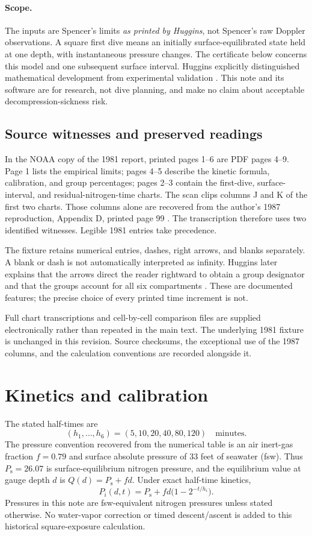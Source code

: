 \documentclass[11pt,letterpaper]{article}
\newcommand{\Ps}{P_{\mathrm{s}}}
\begin{document}
\paragraph{Scope.}
The inputs are Spencer's limits \emph{as printed by Huggins}, not Spencer's raw Doppler observations. A square first dive means an initially surface-equilibrated state held at one depth, with instantaneous pressure changes. The certificate below concerns this model and one subsequent surface interval. Huggins explicitly distinguished mathematical development from experimental validation \cite[disclaimer and p.~6]{Huggins1981}. This note and its software are for research, not dive planning, and make no claim about acceptable decompression-sickness risk.

\subsection{Source witnesses and preserved readings}
In the NOAA copy of the 1981 report, printed pages 1--6 are PDF pages 4--9. Page 1 lists the empirical limits; pages 4--5 describe the kinetic formula, calibration, and group percentages; pages 2--3 contain the first-dive, surface-interval, and residual-nitrogen-time charts. The scan clips columns J and K of the first two charts. Those columns alone are recovered from the author's 1987 reproduction, Appendix D, printed page 99 \cite{Huggins1987}. The transcription therefore uses two identified witnesses. Legible 1981 entries take precedence.

The fixture retains numerical entries, dashes, right arrows, and blanks separately. A blank or dash is not automatically interpreted as infinity. Huggins later explains that the arrows direct the reader rightward to obtain a group designator and that the groups account for all six compartments \cite[p.~13]{Huggins1987}. These are documented features; the precise choice of every printed time increment is not.

Full chart transcriptions and cell-by-cell comparison files are supplied electronically rather than repeated in the main text. The underlying 1981 fixture is unchanged in this revision. Source checksums, the exceptional use of the 1987 columns, and the calculation conventions are recorded alongside it.

\section{Kinetics and calibration}
The stated half-times are
\[
(h_1,\ldots,h_6)=(5,10,20,40,80,120)\quad\text{minutes}.
\]
The pressure convention recovered from the numerical table is an air inert-gas fraction $f=0.79$ and surface absolute pressure of 33 feet of seawater (fsw). Thus $\Ps=26.07$ is surface-equilibrium nitrogen pressure, and the equilibrium value at gauge depth $d$ is $Q(d)=\Ps+fd$. Under exact half-time kinetics,
\begin{equation}
P_i(d,t)=\Ps+fd\bigl(1-2^{-t/h_i}\bigr).
\label{eq:kinetics}
\end{equation}
Pressures in this note are fsw-equivalent nitrogen pressures unless stated otherwise. No water-vapor correction or timed descent/ascent is added to this historical square-exposure calculation.
\end{document}
